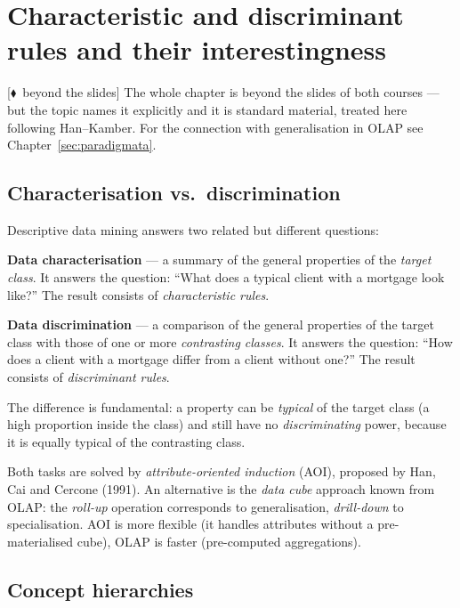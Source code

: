 \documentclass[11pt,a4paper]{article}
\theoremstyle{definition}
\providecommand{\uv}[1]{``#1''}
\newcommand{\mimo}{\textcolor{markcol}{\textsf{\footnotesize[$\blacklozenge$~beyond the slides]}}}
\begin{document}
\newpage
\section{Characteristic and discriminant rules and their interestingness}
\label{sec:pravidla}

\mimo{} The whole chapter is beyond the slides of both courses --- but the topic names it
explicitly and it is standard material, treated here following Han--Kamber. For the connection
with generalisation in OLAP see Chapter~\ref{sec:paradigmata}.

\subsection{Characterisation vs.\ discrimination}

Descriptive data mining answers two related but different questions:

\begin{defbox}
\textbf{Data characterisation} --- a summary of the general properties of the \emph{target class}.
It answers the question: \uv{What does a typical client with a mortgage look like?} The result
consists of \emph{characteristic rules}.

\textbf{Data discrimination} --- a comparison of the general properties of the target class with
those of one or more \emph{contrasting classes}. It answers the question: \uv{How does a client
with a mortgage differ from a client without one?} The result consists of \emph{discriminant
rules}.

The difference is fundamental: a property can be \emph{typical} of the target class (a high
proportion inside the class) and still have no \emph{discriminating} power, because it is equally
typical of the contrasting class.
\end{defbox}

Both tasks are solved by \emph{attribute-oriented induction} (AOI), proposed by Han, Cai and
Cercone (1991). An alternative is the \emph{data cube} approach known from OLAP: the \emph{roll-up}
operation corresponds to generalisation, \emph{drill-down} to specialisation. AOI is more flexible
(it handles attributes without a pre-materialised cube), OLAP is faster (pre-computed aggregations).

\subsection{Concept hierarchies}
\end{document}

